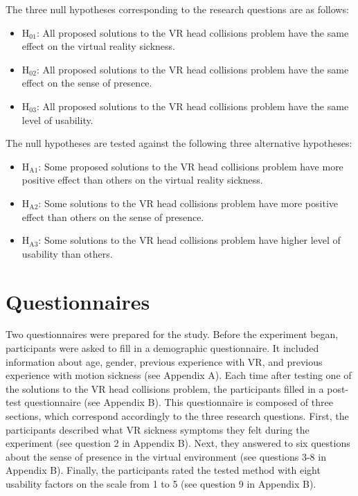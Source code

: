 The three null hypotheses corresponding to the research questions are as follows:

\begin{itemize}
\item H$_{\text{01}}$: All proposed solutions to the VR head collisions problem have the same effect on the virtual reality sickness.
\item H$_{\text{02}}$: All proposed solutions to the VR head collisions problem have the same effect on the sense of presence.
\item H$_{\text{03}}$: All proposed solutions to the VR head collisions problem have the same level of usability.
\end{itemize}

The null hypotheses are tested against the following three alternative hypotheses:

\begin{itemize}
\item H$_{\text{A1}}$: Some proposed solutions to the VR head collisions problem have more positive effect than others on the virtual reality sickness.
\item H$_{\text{A2}}$: Some solutions to the VR head collisions problem have more positive effect than others on the sense of presence.
\item H$_{\text{A3}}$: Some solutions to the VR head collisions problem have higher level of usability than others.
\end{itemize}

\section{Questionnaires}

Two questionnaires were prepared for the study. Before the experiment began, participants were asked to fill in a demographic questionnaire. It included information about age, gender, previous experience with VR, and previous experience with motion sickness (see Appendix A). Each time after testing one of the solutions to the VR head collisions problem, the participants filled in a post-test questionnaire (see Appendix B). This questionnaire is composed of three sections, which correspond accordingly to the three research questions. First, the participants described what VR sickness symptoms they felt during the experiment (see question 2 in Appendix B). Next, they answered to six questions about the sense of presence in the virtual environment (see questions 3-8 in Appendix B). Finally, the participants rated the tested method with eight usability factors on the scale from 1 to 5 (see question 9 in Appendix B).


